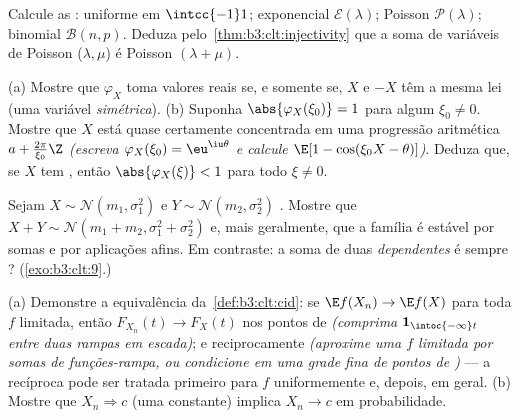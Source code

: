 \begin{exercise}[$\star$]\label{exo:b3:clt:1}
Calcule as : uniforme em $\intcc{-1}1$; exponencial
$\mathcal E(\lambda)$; Poisson $\mathcal P(\lambda)$; binomial $\mathcal B(n, p)$. Deduza pelo~\cref{thm:b3:clt:injectivity} que a
soma de variáveis de Poisson  ($\lambda, \mu$) é Poisson $(\lambda +
\mu)$.
\end{exercise}

\begin{exercise}[$\star\star$]\label{exo:b3:clt:2}
(a) Mostre que $\varphi_X$ toma valores reais se, e somente se, $X$ e
$-X$ têm a mesma lei (uma variável \emph{simétrica}).
(b) Suponha $\abs{\varphi_X(\xi_0)} = 1$ para algum $\xi_0 \neq
0$. Mostre que $X$ está quase
certamente concentrada em uma progressão aritmética $a + \frac{2\pi}{\xi_0}\Z$ \emph{(escreva
$\varphi_X(\xi_0) = \eu^{\iu\theta}$ e calcule $\E[1 -
\cos(\xi_0X - \theta)]$)}. Deduza que, se $X$ tem , então
$\abs{\varphi_X(\xi)} < 1$ para todo $\xi \neq 0$.
\end{exercise}

\begin{exercise}[$\star\star$]\label{exo:b3:clt:3}
Sejam $X \sim \mathcal N(m_1, \sigma_1^2)$ e $Y \sim
\mathcal N(m_2, \sigma_2^2)$ . Mostre que $X + Y
\sim \mathcal N(m_1 + m_2, \sigma_1^2 + \sigma_2^2)$ e, mais geralmente,
que a família  é estável por somas  e por
aplicações afins. Em contraste: a soma de duas 
\emph{dependentes} é sempre ? (\cref{exo:b3:clt:9}.)
\end{exercise}

\begin{exercise}[$\star\star$]\label{exo:b3:clt:4}
(a) Demonstre a equivalência da~\cref{def:b3:clt:cid}: se $\E f(X_n) \to \E f(X)$ para toda
$f$  limitada, então $F_{X_n}(t) \to F_X(t)$ nos pontos de 
\emph{(comprima $\mathbf 1_{\intoc{-\infty}t}$ entre duas rampas  em escada)}; e
reciprocamente \emph{(aproxime uma $f$  limitada por somas de
funções-rampa, ou condicione em uma grade fina de pontos de
)} --- a recíproca pode ser tratada primeiro para $f$
uniformemente  e, depois, em geral.
(b) Mostre que $X_n \Rightarrow c$ (uma constante) implica $X_n
\to c$ em probabilidade.
\end{exercise}

